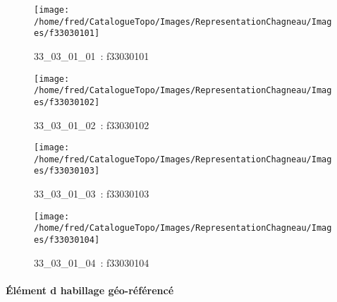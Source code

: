 \documentclass[12pt,titlepage]{book}
\begin{document}
\begin{figure}[h!]
  \hfill         %
  \begin{minipage}[t]{3cm}
    \begin{center}
      \texttt{[image: /home/fred/CatalogueTopo/Images/RepresentationChagneau/Images/f33030101]}
      \caption[~33\_03\_01\_01]{\small{33\_03\_01\_01~:} \tiny{f33030101}}\label{f33030101}
    \end{center}
  \end{minipage}
  \begin{minipage}[t]{3cm}
    \begin{center}
      \texttt{[image: /home/fred/CatalogueTopo/Images/RepresentationChagneau/Images/f33030102]}
      \caption[~33\_03\_01\_02]{\small{33\_03\_01\_02~:} \tiny{f33030102}}\label{f33030102}
    \end{center}
  \end{minipage}
  \begin{minipage}[t]{3cm}
    \begin{center}
      \texttt{[image: /home/fred/CatalogueTopo/Images/RepresentationChagneau/Images/f33030103]}
      \caption[~33\_03\_01\_03]{\small{33\_03\_01\_03~:} \tiny{f33030103}}\label{f33030103}
    \end{center}
  \end{minipage}
  \begin{minipage}[t]{3cm}
    \begin{center}
      \texttt{[image: /home/fred/CatalogueTopo/Images/RepresentationChagneau/Images/f33030104]}
      \caption[~33\_03\_01\_04]{\small{33\_03\_01\_04~:} \tiny{f33030104}}\label{f33030104}
    \end{center}
  \end{minipage}
\end{figure}


\paragraph{Élément d habillage géo-référencé}
\noindent
\vspace{\baselineskip}
\end{document}
